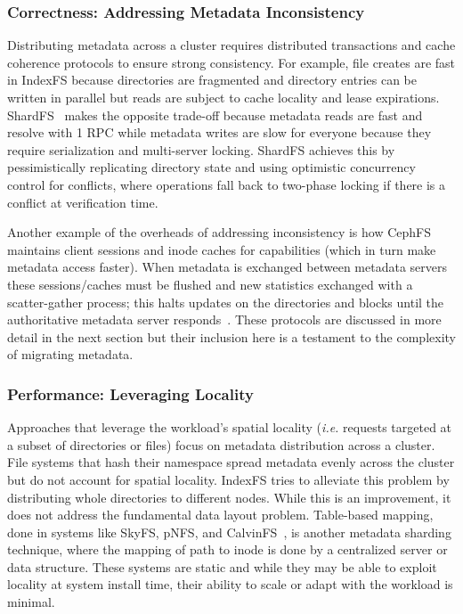 \subsubsection{Correctness: Addressing Metadata Inconsistency}

Distributing metadata across a cluster requires distributed transactions and
cache coherence protocols to ensure strong consistency.  For example, file
creates are fast in IndexFS because directories are fragmented and directory
entries can be written in parallel but reads are subject to cache locality and
lease expirations.  ShardFS~\cite{xiao:socc15-shardfs} makes the opposite
trade-off because metadata reads are fast and resolve with 1 RPC while metadata
writes are slow for everyone because they require serialization and
multi-server locking.  ShardFS achieves this by pessimistically replicating
directory state and using optimistic concurrency control for conflicts, where
operations fall back to two-phase locking if there is a conflict at
verification time.

Another example of the overheads of addressing inconsistency is how CephFS
maintains client sessions and inode caches for capabilities (which in turn make
metadata access faster). When metadata is exchanged between metadata servers
these sessions/caches must be flushed and new statistics exchanged with a
scatter-gather process; this halts updates on the directories and blocks until
the authoritative metadata server responds~\cite{docs:cephinternals}.  These
protocols are discussed in more detail in the next section but their inclusion
here is a testament to the complexity of migrating metadata.

\subsubsection{Performance: Leveraging Locality}

Approaches that leverage the workload's spatial locality ({\it i.e.} requests
targeted at a subset of directories or files) focus on metadata distribution
across a cluster. File systems that hash their namespace spread metadata
evenly across the cluster but do not account for spatial locality.  IndexFS
tries to alleviate this problem by distributing whole directories to different
nodes.  While this is an improvement, it does not address the fundamental data
layout problem.  Table-based mapping, done in systems like SkyFS, pNFS, and
CalvinFS~\cite{thomson:fast2015-calvinfs}, is another metadata sharding
technique, where the mapping of path to inode is done by a centralized server
or data structure. These systems are static and while they may be able to
exploit locality at system install time, their ability to scale or adapt with
the workload is minimal.

